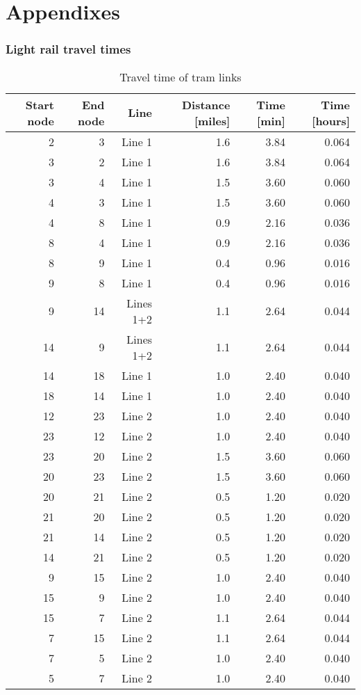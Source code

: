 \appendix
\part*{Appendixes}

\section{Light rail travel times}
\label{sec:tram_travel_times}

\begin{table}
\centering
\begin{tabular}{rrrrrr}
\toprule
Start node & End node & Line & Distance [miles] & Time [min] & Time [hours] \\
\midrule
2 & 3 & Line 1 & 1.6 & 3.84 & 0.064 \\
3 & 2 & Line 1 & 1.6 & 3.84 & 0.064 \\
3 & 4 & Line 1 & 1.5 & 3.60 & 0.060 \\
4 & 3 & Line 1 & 1.5 & 3.60 & 0.060 \\
4 & 8 & Line 1 & 0.9 & 2.16 & 0.036 \\
8 & 4 & Line 1 & 0.9 & 2.16 & 0.036 \\
8 & 9 & Line 1 & 0.4 & 0.96 & 0.016 \\
9 & 8 & Line 1 & 0.4 & 0.96 & 0.016 \\
9 & 14 & Lines 1+2 & 1.1 & 2.64 & 0.044 \\
14 & 9 & Lines 1+2 & 1.1 & 2.64 & 0.044 \\
14 & 18 & Line 1 & 1.0 & 2.40 & 0.040 \\
18 & 14 & Line 1 & 1.0 & 2.40 & 0.040 \\
12 & 23 & Line 2 & 1.0 & 2.40 & 0.040 \\
23 & 12 & Line 2 & 1.0 & 2.40 & 0.040 \\
23 & 20 & Line 2 & 1.5 & 3.60 & 0.060 \\
20 & 23 & Line 2 & 1.5 & 3.60 & 0.060 \\
20 & 21 & Line 2 & 0.5 & 1.20 & 0.020 \\
21 & 20 & Line 2 & 0.5 & 1.20 & 0.020 \\
21 & 14 & Line 2 & 0.5 & 1.20 & 0.020 \\
14 & 21 & Line 2 & 0.5 & 1.20 & 0.020 \\
9 & 15 & Line 2 & 1.0 & 2.40 & 0.040 \\
15 & 9 & Line 2 & 1.0 & 2.40 & 0.040 \\
15 & 7 & Line 2 & 1.1 & 2.64 & 0.044 \\
7 & 15 & Line 2 & 1.1 & 2.64 & 0.044 \\
7 & 5 & Line 2 & 1.0 & 2.40 & 0.040 \\
5 & 7 & Line 2 & 1.0 & 2.40 & 0.040 \\
\bottomrule
\end{tabular}
\caption{Travel time of tram links}
\end{table}

